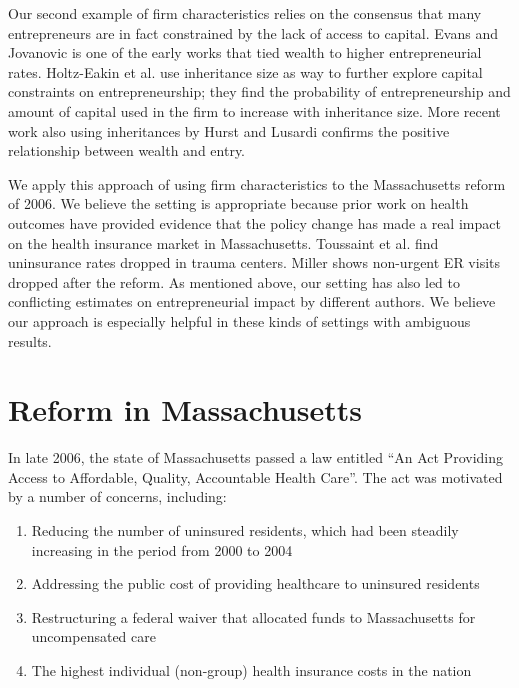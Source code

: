 \documentclass[12pt]{article}
\begin{document}
Our second example of firm characteristics relies on the consensus that many entrepreneurs are in fact constrained by the lack of access to capital. Evans and Jovanovic \cite{evans} is one of the early works that tied wealth to higher entrepreneurial rates. Holtz-Eakin et al. \cite{holtz_capital} use inheritance size as way to further explore capital constraints on entrepreneurship; they find the probability of entrepreneurship and amount of capital used in the firm to increase with inheritance size. More recent work also using inheritances by Hurst and Lusardi \cite{hurst} confirms the positive relationship between wealth and entry. 

We apply this approach of using firm characteristics to the Massachusetts reform of 2006. We believe the setting is appropriate because prior work on health outcomes have provided evidence that the policy change has made a real impact on the health insurance market in Massachusetts. Toussaint et al. \cite{toussaint} find uninsurance rates dropped in trauma centers. Miller \cite{miller_er} shows non-urgent ER visits dropped after the reform. As mentioned above, our setting has also led to conflicting estimates on entrepreneurial impact by different authors. We believe our approach is especially helpful in these kinds of settings with ambiguous results. 

\section{Reform in Massachusetts}
\label{sec:reform}


In late 2006, the state of Massachusetts passed a law entitled ``An Act Providing Access to Affordable, Quality, Accountable Health Care''. The act was motivated by a number of concerns, including:

\begin{enumerate}
\item Reducing the number of uninsured residents, which had been steadily increasing in the period from 2000 to 2004 \cite{bisweek}
\item Addressing the public cost of providing healthcare to uninsured residents \cite{npr}
\item Restructuring a federal waiver that allocated funds to Massachusetts for uncompensated care \cite{heritage}
\item The highest individual (non-group) health insurance costs in the nation \cite{gruber_mass}
\end{enumerate}
\end{document}
